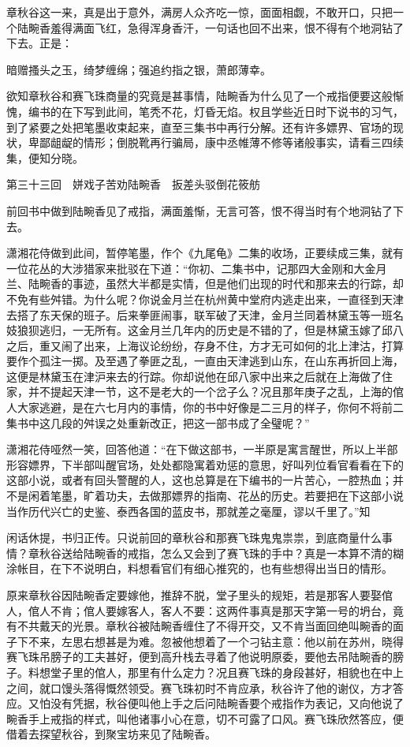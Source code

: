 \documentclass[12pt,UTF8]{ctexbook}
\begin{document}
{{{章秋谷这一来，真是出于意外，满房人众齐吃一惊，面面相觑，不敢开口，只把一个陆畹香羞得满面飞红，急得浑身香汗，一句话也回不出来，恨不得有个地洞钻了下去。正是：

暗赠搔头之玉，绮梦缠绵；强追约指之银，萧郎薄幸。

欲知章秋谷和赛飞珠商量的究竟是甚事情，陆畹香为什么见了一个戒指便要这般惭愧，编书的在下写到此间，笔秃不花，灯昏无焰。权且学些近日时下说书的习气，到了紧要之处把笔墨收束起来，直至三集书中再行分解。还有许多嫖界、官场的现状，卑鄙龃龊的情形；倒脱靴再行骗局，康中丞帷薄不修等诸般事实，请看三四续集，便知分晓。





第三十三回　姘戏子苦劝陆畹香　扳差头驳倒花筱舫





前回书中做到陆畹香见了戒指，满面羞惭，无言可答，恨不得当时有个地洞钻了下去。

潇湘花侍做到此间，暂停笔墨，作个《九尾龟》二集的收场，正要续成三集，就有一位花丛的大涉猎家来批驳在下道：“你初、二集书中，记那四大金刚和大金月兰、陆畹香的事迹，虽然大半都是实情，但是他们出现的时代和那来去的行踪，却不免有些舛错。为什么呢？你说金月兰在杭州黄中堂府内逃走出来，一直径到天津去搭了东天保的班子。后来拳匪闹事，联军破了天津，金月兰同着林黛玉等一班名妓狼狈逃归，一无所有。这金月兰几年内的历史是不错的了，但是林黛玉嫁了邱八之后，重又闹了出来，上海议论纷纷，存身不住，方才无可如何的北上津沽，打算要作个孤注一掷。及至遇了拳匪之乱，一直由天津逃到山东，在山东再折回上海，这便是林黛玉在津沪来去的行踪。你却说他在邱八家中出来之后就在上海做了住家，并不提起天津一节，这不是老大的一个岔子么？况且那年庚子之乱，上海的倌人大家逃避，是在六七月内的事情，你的书中好像是二三月的样子，你何不将前二集书中这几段的舛误之处重新改正，把这一部书成了全璧呢？”

潇湘花侍哑然一笑，回答他道：“在下做这部书，一半原是寓言醒世，所以上半部形容嫖界，下半部叫醒官场，处处都隐寓着劝惩的意思，好叫列位看官看看在下的这部小说，或者有回头警醒的人，这也总算是在下编书的一片苦心，一腔热血；并不是闲着笔墨，旷着功夫，去做那嫖界的指南、花丛的历史。若要把在下这部小说当作历代兴亡的史鉴、泰西各国的蓝皮书，那就差之毫厘，谬以千里了。”知

闲话休提，书归正传。只说前回的章秋谷和那赛飞珠鬼鬼祟祟，到底商量什么事情？章秋谷送给陆畹香的戒指，怎么又会到了赛飞珠的手中？真是一本算不清的糊涂帐目，在下不说明白，料想看官们有细心推究的，也有些想得出当日的情形。

原来章秋谷因陆畹香定要嫁他，推辞不脱，堂子里头的规矩，若是那客人要娶倌人，倌人不肯；倌人要嫁客人，客人不要：这两件事真是那天字第一号的坍台，竟有不共戴天的光景。章秋谷被陆畹香缠住了不得开交，又不肯当面回绝叫畹香的面子下不来，左思右想甚是为难。忽被他想着了一个刁钻主意：他以前在苏州，晓得赛飞珠吊膀子的工夫甚好，便到高升栈去寻着了他说明原委，要他去吊陆畹香的膀子。料想堂子里的倌人，那里有什么定力？况且赛飞珠的身段甚好，相貌也在中上之间，就口馒头落得慨然领受。赛飞珠初时不肯应承，秋谷许了他的谢仪，方才答应。又怕没有凭据，秋谷便叫他上手之后问陆畹香要个戒指作为表记，又向他说了畹香手上戒指的样式，叫他诸事小心在意，切不可露了口风。赛飞珠欣然答应，便借着去探望秋谷，到聚宝坊来见了陆畹香。

}}}
\end{document}
